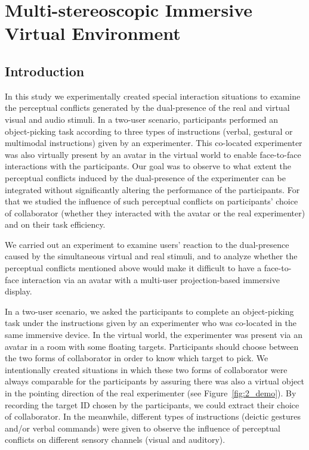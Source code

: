\chapter{Multi-stereoscopic Immersive Virtual Environment}
\label{chapter:multistereo}
\minitoc

\section{Introduction}
In this study we experimentally created special interaction situations to examine the perceptual conflicts generated by the dual-presence of the real and virtual visual and audio stimuli. In a two-user scenario, participants performed an object-picking task according to three types of instructions (verbal, gestural or multimodal instructions) given by an experimenter. This co-located experimenter was also virtually present by an avatar in the virtual world to enable face-to-face interactions with the participants. Our goal was to observe to what extent the perceptual conflicts induced by the dual-presence of the experimenter can be integrated without significantly altering the performance of the participants. For that we studied the influence of such perceptual conflicts on participants' choice of collaborator (whether they interacted with the avatar or the real experimenter) and on their task efficiency.

We carried out an experiment to examine users' reaction to the dual-presence caused by the simultaneous virtual and real stimuli, and to analyze whether the perceptual conflicts mentioned above would make it difficult to have a face-to-face interaction via an avatar with a multi-user projection-based immersive display.

In a two-user scenario, we asked the participants to complete an object-picking task under the instructions given by an experimenter who was co-located in the same immersive device. In the virtual world, the experimenter was present via an avatar in a room with some floating targets. Participants should choose between the two forms of collaborator in order to know which target to pick. We intentionally created situations in which these two forms of collaborator were always comparable for the participants by assuring there was also a virtual object in the pointing direction of the real experimenter (see Figure~\ref{fig:2_demo}). By recording the target ID chosen by the participants, we could extract their choice of collaborator. In the meanwhile, different types of instructions (deictic gestures and/or verbal commands) were given to observe the influence of perceptual conflicts on different sensory channels (visual and auditory).

